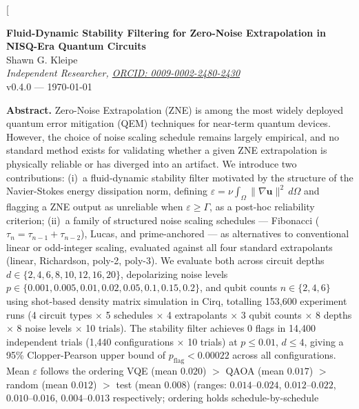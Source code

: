 \documentclass[10pt,letterpaper]{article}
\begin{document}
\twocolumn[{%
  \centering
  {\large\bfseries Fluid-Dynamic Stability Filtering for Zero-Noise
    Extrapolation in NISQ-Era Quantum Circuits}\\[6pt]
  {\normalsize Shawn G. Kleipe}\\[2pt]
  {\small\itshape Independent Researcher,
    \href{https://orcid.org/0009-0002-2480-2430}%
         {ORCID: 0009-0002-2480-2430}}\\[2pt]
  {\small v0.4.0 --- \today}\\[8pt]

  \begin{minipage}{0.92\textwidth}\small
  \textbf{Abstract.}
  Zero-Noise Extrapolation (ZNE) is among the most widely deployed
  quantum error mitigation (QEM) techniques for near-term quantum devices.
  However, the choice of noise scaling schedule remains largely empirical,
  and no standard method exists for validating whether a given ZNE
  extrapolation is physically reliable or has diverged into an artifact.
  We introduce two contributions: (i)~a fluid-dynamic stability filter
  motivated by the structure of the Navier-Stokes energy dissipation norm,
  defining $\varepsilon = \nu\int_{\Omega}\|\nabla\mathbf{u}\|^{2}\,d\Omega$
  and flagging a ZNE output as unreliable when $\varepsilon \geq \Gamma$,
  as a post-hoc reliability criterion; (ii)~a family of structured noise
  scaling schedules --- Fibonacci ($\tau_{n}=\tau_{n-1}+\tau_{n-2}$),
  Lucas, and prime-anchored --- as alternatives to conventional linear
  or odd-integer scaling, evaluated against all four standard extrapolants
  (linear, Richardson, poly-2, poly-3).
  We evaluate both across circuit depths $d\in\{2,4,6,8,10,12,16,20\}$,
  depolarizing noise levels
  $p\in\{0.001,0.005,0.01,0.02,0.05,0.1,0.15,0.2\}$, and qubit counts
  $n\in\{2,4,6\}$ using shot-based density matrix simulation in Cirq,
  totalling 153,600 experiment runs
  (4 circuit types $\times$ 5 schedules $\times$ 4 extrapolants
  $\times$ 3 qubit counts $\times$ 8 depths $\times$ 8 noise levels
  $\times$ 10 trials).
  The stability filter achieves 0 flags in 14,400 independent trials
  (1,440 configurations $\times$ 10 trials) at $p\leq 0.01$,
  $d\leq 4$, giving a 95\% Clopper-Pearson upper bound of
  $p_{\mathrm{flag}}<0.00022$ across all configurations.
  Mean $\varepsilon$ follows the ordering
  VQE (mean $0.020$) $>$ QAOA (mean $0.017$) $>$
  random (mean $0.012$) $>$ test (mean $0.008$)
  (ranges: $0.014$--$0.024$, $0.012$--$0.022$, $0.010$--$0.016$,
  $0.004$--$0.013$ respectively; ordering holds schedule-by-schedule

\end{minipage}}
\end{document}
